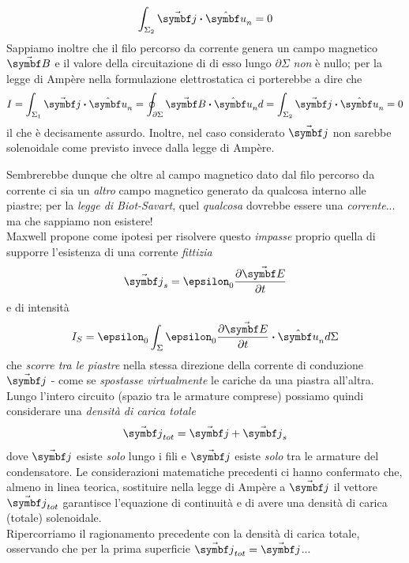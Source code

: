 \begin{equation*}
	\int_{\Sigma_2}\vba{j}\vdot\vbh{u}_n=0
\end{equation*}
Sappiamo inoltre che il filo percorso da corrente genera un campo magnetico $\vba{B}$ e il valore della circuitazione di di esso lungo $\partial \Sigma$ \textit{non} è nullo; per la legge di Ampère nella formulazione elettrostatica ci porterebbe a dire che
\begin{equation*}
	I=\int_{\Sigma_1}\vba{j}\vdot\vbh{u}_n=\oint_{\partial \Sigma}\vba{B}\vdot\vbh{u}_nd=\int_{\Sigma_2}\vba{j}\vdot\vbh{u}_n=0
\end{equation*} 
il che è decisamente assurdo. Inoltre, nel caso considerato $\vba{j}$ non sarebbe solenoidale come previsto invece dalla legge di Ampère.

Sembrerebbe dunque che oltre al campo magnetico dato dal filo percorso da corrente ci sia un \textit{altro} campo magnetico generato da qualcosa interno alle piastre; per la \textit{legge di Biot-Savart}, quel \textit{qualcosa} dovrebbe essere una \textit{corrente}... ma che sappiamo non esistere!\\
Maxwell propone come ipotesi per risolvere questo \textit{impasse} proprio quella di supporre l'esistenza di una corrente \textit{fittizia}
\begin{equation*}
	\vba{j}_s=\epsilon_0\pdv{\vba{E}}{t}
\end{equation*}
e di intensità
\begin{equation*}
	I_S=\epsilon_0\int_{\Sigma}\epsilon_0\pdv{\vba{E}}{t}\vdot \vbh{u}_nd\Sigma
\end{equation*}
che \textit{scorre tra le piastre} nella stessa direzione della corrente di conduzione $\vba{j}$ - come se \textit{spostasse virtualmente} le cariche da una piastra all'altra.
Lungo l'intero circuito (spazio tra le armature comprese) possiamo quindi considerare una \textit{densità di carica totale}
\begin{equation*}
	\vba{j}_{tot}=\vba{j}+\vba{j}_s
\end{equation*}
dove $\vba{j}$ esiste \textit{solo} lungo i fili e $\vba{j}$ esiste \textit{solo} tra le armature del condensatore. Le considerazioni matematiche precedenti ci hanno confermato che, almeno in linea teorica, sostituire nella legge di Ampère a $\vba{j}$ il vettore $\vba{j}_{tot}$ garantisce l'equazione di continuità e di avere una densità di carica (totale) solenoidale.\\
Ripercorriamo il ragionamento precedente con la densità di carica totale, osservando che per la prima superficie $\vba{j}_{tot}=\vba{j}$...
